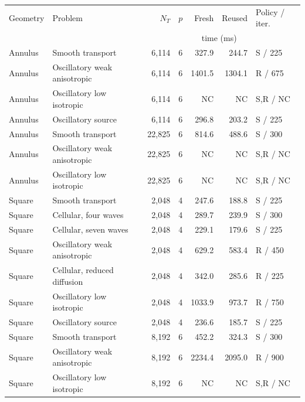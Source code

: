 \begin{tabular}{llrrrrl}
\toprule
Geometry & Problem & $N_T$ & $p$ & Fresh & Reused & Policy / iter. \\
 & & & & \multicolumn{2}{c}{time (ms)} & \\
\midrule
Annulus & Smooth transport & 6,114 & 6 & 327.9 & 244.7 & S / 225 \\
Annulus & Oscillatory weak anisotropic & 6,114 & 6 & 1401.5 & 1304.1 & R / 675 \\
Annulus & Oscillatory low isotropic & 6,114 & 6 & NC & NC & S,R / NC \\
Annulus & Oscillatory source & 6,114 & 6 & 296.8 & 203.2 & S / 225 \\
Annulus & Smooth transport & 22,825 & 6 & 814.6 & 488.6 & S / 300 \\
Annulus & Oscillatory weak anisotropic & 22,825 & 6 & NC & NC & S,R / NC \\
Annulus & Oscillatory low isotropic & 22,825 & 6 & NC & NC & S,R / NC \\
Square & Smooth transport & 2,048 & 4 & 247.6 & 188.8 & S / 225 \\
Square & Cellular, four waves & 2,048 & 4 & 289.7 & 239.9 & S / 300 \\
Square & Cellular, seven waves & 2,048 & 4 & 229.1 & 179.6 & S / 225 \\
Square & Oscillatory weak anisotropic & 2,048 & 4 & 629.2 & 583.4 & R / 450 \\
Square & Cellular, reduced diffusion & 2,048 & 4 & 342.0 & 285.6 & R / 225 \\
Square & Oscillatory low isotropic & 2,048 & 4 & 1033.9 & 973.7 & R / 750 \\
Square & Oscillatory source & 2,048 & 4 & 236.6 & 185.7 & S / 225 \\
Square & Smooth transport & 8,192 & 6 & 452.2 & 324.3 & S / 300 \\
Square & Oscillatory weak anisotropic & 8,192 & 6 & 2234.4 & 2095.0 & R / 900 \\
Square & Oscillatory low isotropic & 8,192 & 6 & NC & NC & S,R / NC \\
\bottomrule
\end{tabular}

